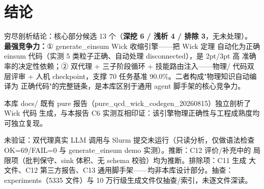 \documentclass[UTF8]{ctexart}
\begin{document}
\section{结论}

\begin{conclbox}
穷尽剖析结论：核心部分候选 13 个（\textbf{深挖 6 / 浅析 4 / 排除 3}，无未处理）。
\textbf{最强竞争力：}① \textcolor{algo}{generate\_einsum Wick 收缩引擎}——把 Wick 定理
自动化为正确 einsum 代码（实测 5 类粒子正确、自动处理 disconnected），是 2pt/3pt 高
准确率的决定性依赖；② \textcolor{algo}{双代理 + 三子阶段循环 + 技能路由注入}——物理/
代码双层评审 + 人机 checkpoint，支撑 70 任务基准 90.0\%。二者构成"物理知识自动编译为
正确代码"的完整链条，是本库区别于通用 agent 脚手架的核心竞争力。
\end{conclbox}

\begin{refbox}
本库 docs/ 既有 pure 报告（pure\_qcd\_wick\_codegen\_20260815）独立剖析了 Wick 代码
生成，与本报告 C6 实测互相印证：该引擎物理正确性与工程成熟度均可独立复现。
\end{refbox}

\begin{warnbox}
\textcolor{warn}{未验证}：双代理真实 LLM 调用与 Slurm 提交未运行（只读分析，仅做语法检查
OK=69/FAIL=0 与 generate\_einsum demo 实测）。\textcolor{warn}{推断}：C12 评价/补充中的
局限项（批判保守、sink 体积、无 schema 校验）均为推断。\textcolor{warn}{排除项}：C11 生成
大文件、C12 第三方报告、C13 通用脚手架——均非本库设计部分。\textcolor{warn}{抽查}：
experiments（5335 文件）与 10 万行级生成文件仅抽查/索引，未逐文件深读。
\end{warnbox}
\end{document}
